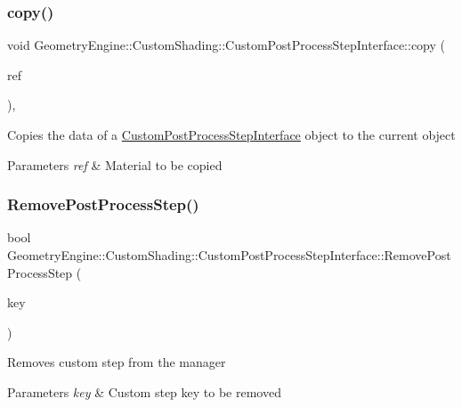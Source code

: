 \subsubsection{\texorpdfstring{copy()}{copy()}}
{\footnotesize\ttfamily void Geometry\+Engine\+::\+Custom\+Shading\+::\+Custom\+Post\+Process\+Step\+Interface\+::copy (\begin{DoxyParamCaption}\item[{const \mbox{\hyperlink{class_geometry_engine_1_1_custom_shading_1_1_custom_post_process_step_interface}{Custom\+Post\+Process\+Step\+Interface}} \&}]{ref }\end{DoxyParamCaption})\hspace{0.3cm}{\ttfamily [protected]}, {\ttfamily [virtual]}}

Copies the data of a \mbox{\hyperlink{class_geometry_engine_1_1_custom_shading_1_1_custom_post_process_step_interface}{Custom\+Post\+Process\+Step\+Interface}} object to the current object 
\begin{DoxyParams}{Parameters}
{\em ref} & Material to be copied \\
\hline
\end{DoxyParams}
\mbox{\label{class_geometry_engine_1_1_custom_shading_1_1_custom_post_process_step_interface_a206813ece767bcbf0758dda0cd2446fd}} 
\subsubsection{\texorpdfstring{RemovePostProcessStep()}{RemovePostProcessStep()}}
{\footnotesize\ttfamily bool Geometry\+Engine\+::\+Custom\+Shading\+::\+Custom\+Post\+Process\+Step\+Interface\+::\+Remove\+Post\+Process\+Step (\begin{DoxyParamCaption}\item[{const \mbox{\hyperlink{namespace_geometry_engine_1_1_custom_shading_a09e44ca81de5fe08c6d50271d680c4b1}{Custom\+Post\+Process\+Steps}} \&}]{key }\end{DoxyParamCaption})}

Removes custom step from the manager 
\begin{DoxyParams}{Parameters}
{\em key} & Custom step key to be removed \\
\hline
\end{DoxyParams}
\mbox{\label{class_geometry_engine_1_1_custom_shading_1_1_custom_post_process_step_interface_a953149fd44b01423b1adab83cd16064a}} 
